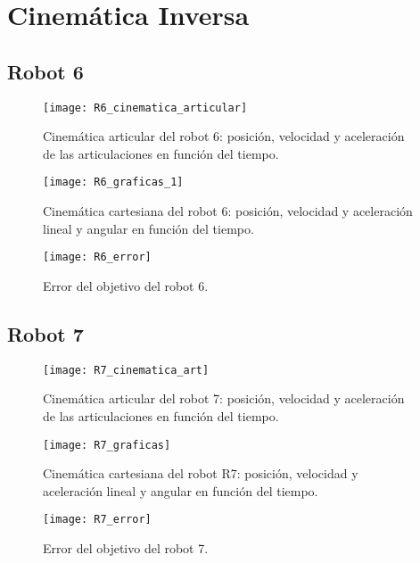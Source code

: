  \section{Cinemática Inversa}


	\subsection{Robot 6}
	   \begin{figure}[H]
	   	\centering
	   	\texttt{[image: R6\_cinematica\_articular]}
	   	\caption{Cinemática articular del robot 6: posición, velocidad y aceleración de las articulaciones en función del tiempo.}
	   	\label{fig:cinematica_articular}
	   \end{figure}
	   
	   \begin{figure}[H]
	   	\centering
	   	\texttt{[image: R6\_graficas\_1]}
	   	\caption{Cinemática cartesiana del robot 6: posición, velocidad y aceleración lineal y angular en función del tiempo.}
	   	\label{fig:cinematica_cartesiana}
	   \end{figure}
	   
	   \begin{figure}[H]
	   	\centering
	   	\texttt{[image: R6\_error]}
	   	\caption{Error del objetivo del robot 6.}
	   	\label{fig:error_objetivo6}
	   \end{figure}
	   
			
			
	\subsection{Robot 7}
	\begin{figure}[H]
		\centering
		\texttt{[image: R7\_cinematica\_art]}
		\caption{Cinemática articular del robot 7: posición, velocidad y aceleración de las articulaciones en función del tiempo.}
		\label{fig:R7_cinematica_articular}
	\end{figure}
	
	\begin{figure}[H]
		\centering
		\texttt{[image: R7\_graficas]}
		\caption{Cinemática cartesiana del robot R7: posición, velocidad y aceleración lineal y angular en función del tiempo.}
		\label{fig:R7_cinematica_cartesiana}
	\end{figure}
	
	\begin{figure}[H]
		\centering
		\texttt{[image: R7\_error]}
		\caption{Error del objetivo del robot 7.}
		\label{fig:R7_error_objetivo7}
	\end{figure}
	
	
